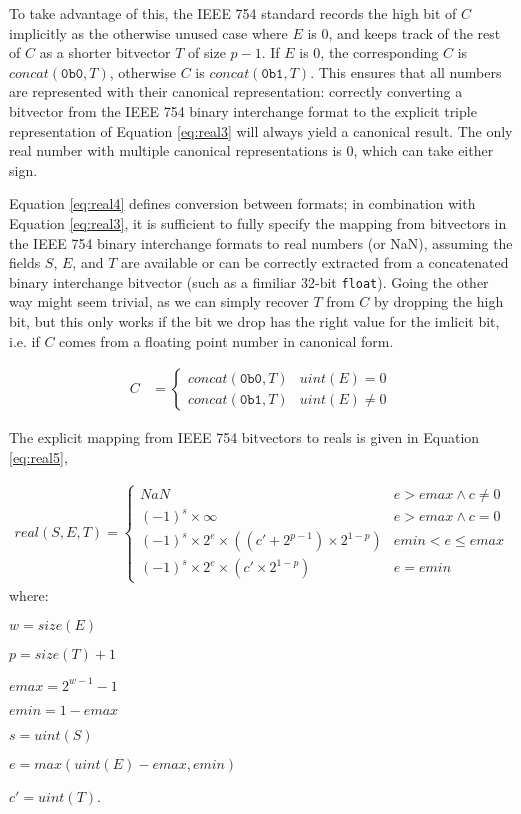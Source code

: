 \documentclass[letterpaper,10pt]{article}
\begin{document}
To take advantage of this, the IEEE 754 standard records the high bit of $C$ implicitly as the otherwise unused case where $E$ is 0, and keeps track of the rest of $C$ as a shorter bitvector $T$ of size $p - 1$. If $E$ is 0, the corresponding $C$ is $concat(\texttt{0b0}, T)$, otherwise $C$ is $concat(\texttt{0b1}, T)$. This ensures that all numbers are represented with their canonical representation: correctly converting a bitvector from the IEEE 754 binary interchange format to the explicit triple representation of Equation \ref{eq:real3} will always yield a canonical result. The only real number with multiple canonical representations is 0, which can take either sign.

Equation \ref{eq:real4} defines conversion between formats; in combination with Equation \ref{eq:real3}, it is sufficient to fully specify the mapping from bitvectors in the IEEE 754 binary interchange formats to real numbers (or NaN), assuming the fields $S$, $E$, and $T$ are available or can be correctly extracted from a concatenated binary interchange bitvector (such as a fimiliar 32-bit \texttt{float}). Going the other way might seem trivial, as we can simply recover $T$ from $C$ by dropping the high bit, but this only works if the bit we drop has the right value for the imlicit bit, i.e. if $C$ comes from a floating point number in canonical form.

\begin{align} \label{eq:real4}
 C &=
 \begin{cases}
  concat(\texttt{0b0}, T) & uint(E) = 0 \\
  concat(\texttt{0b1}, T) & uint(E) \neq 0
 \end{cases}
\end{align}

The explicit mapping from IEEE 754 bitvectors to reals is given in Equation \ref{eq:real5},

\begin{align} \label{eq:real5}
 real(S, E, T) =
 \begin{cases}
  NaN                                                      & e > emax \land c \neq 0 \\
  (-1)^s \times \infty                                     & e > emax \land c = 0    \\
  (-1)^s \times 2^e \times ((c' + 2^{p-1}) \times 2^{1-p}) & emin < e \leq emax      \\
  (-1)^s \times 2^e \times (c' \times 2^{1 - p})           & e = emin
 \end{cases}
\end{align}
where:
\begin{description}
 \item $w = size(E)$
 \item $p = size(T) + 1$
 \item $emax = 2^{w-1} - 1$
 \item $emin = 1 - emax$
 \item $s = uint(S)$
 \item $e = max(uint(E) - emax, emin)$
 \item $c' = uint(T)$.
\end{description}
\end{document}

